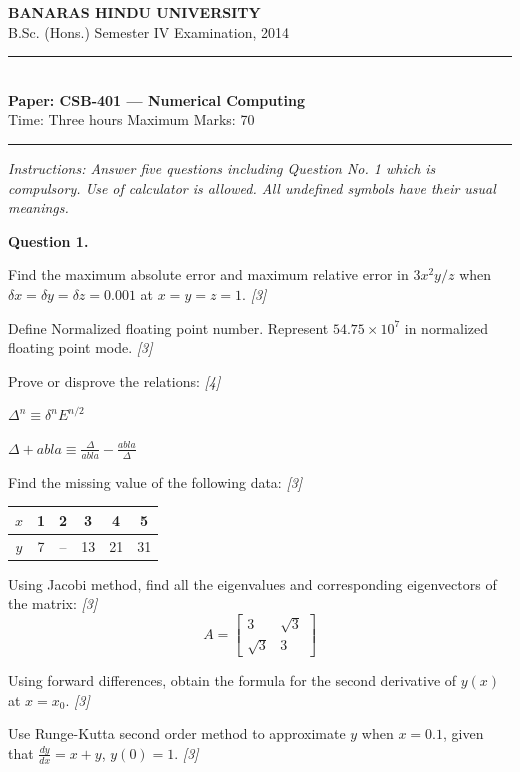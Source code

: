 \documentclass[11pt,a4paper]{article}
\newcommand{\pts}[1]{\hfill   \textit{[#1]}}
\begin{document}
\begin{center}
  {\large\bfseries BANARAS HINDU UNIVERSITY}\\[2pt]
  {
\normalsize B.Sc. (Hons.) Semester IV Examination, 2014}\\[6pt]
  \rule{0.8\linewidth}{0.5pt}\\[6pt]
  {\large\bfseries Paper: CSB-401 --- Numerical Computing}\\[4pt]
  {
\normalsize Time: Three hours \hfill Maximum Marks: 70}
\end{center}

\rule{\linewidth}{0.4pt}

\smallskip



\noindent   \textit{Instructions: Answer five questions including Question No. 1 which is compulsory. Use of calculator is allowed. All undefined symbols have their usual meanings.}

\bigskip

\medskip


\noindent   \textbf{Question 1.}

\begin{parts}
  \item Find the maximum absolute error and maximum relative error in $3x^2 y / z$ when $\delta x = \delta y = \delta z = 0.001$ at $x = y = z = 1$. \pts{3}
  \item Define Normalized floating point number. Represent $54.75  \times 10^7$ in normalized floating point mode. \pts{3}
  \item Prove or disprove the relations: \pts{4}
  
\begin{parts}
    \item $\Delta^n \equiv \delta^n E^{n/2}$
    \item $\Delta + 
abla \equiv \frac{\Delta}{
abla} - \frac{
abla}{\Delta}$
  \end{parts}
  \item Find the missing value of the following data: \pts{3}
  
\begin{center}
    
\begin{tabular}{|c|c|c|c|c|c|}
      \hline
      $x$ & 1 & 2 & 3 & 4 & 5 \\
      \hline
      $y$ & 7 & -- & 13 & 21 & 31 \\
      \hline
    \end{tabular}
  \end{center}
  \item Using Jacobi method, find all the eigenvalues and corresponding eigenvectors of the matrix: \pts{3}
  \[ A = 
\begin{bmatrix} 3 & \sqrt{3} \\ \sqrt{3} & 3 \end{bmatrix} \]
  \item Using forward differences, obtain the formula for the second derivative of $y(x)$ at $x = x_0$. \pts{3}
  \item Use Runge-Kutta second order method to approximate $y$ when $x = 0.1$, given that $\frac{dy}{dx} = x + y$, $y(0) = 1$. \pts{3}
\end{parts}
\end{document}
